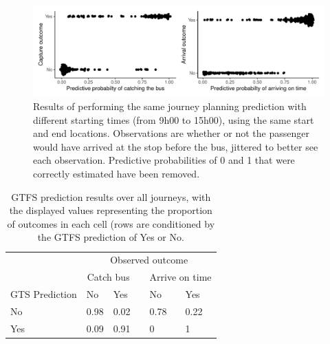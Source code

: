 \begin{knitrout}\small
{}\color{fgcolor}\begin{figure}

{\centering \includegraphics[width=\textwidth]{figure/eta_journey_results_avg-1} 

}

\caption[Results of performing the same journey planning prediction with different starting times (from  9h00 to 15h00), using the same start and end locations]{Results of performing the same journey planning prediction with different starting times (from  9h00 to 15h00), using the same start and end locations. Observations are whether or not the passenger would have arrived at the stop before the bus, jittered to better see each observation. Predictive probabilities of 0 and 1 that were correctly estimated have been removed.}\label{fig:eta_journey_results_avg}
\end{figure}

\begin{table}

\caption{\label{tab:eta_journey_results_avg}GTFS prediction results over all journeys, with the displayed values representing the proportion of outcomes in each cell (rows are conditioned by the GTFS prediction of Yes or No. }
\centering
\fontsize{8}{10}\selectfont
\begin{tabular}[t]{llllll}
\toprule
\multicolumn{1}{c}{} & \multicolumn{5}{c}{Observed outcome} \\
\cmidrule(l{3pt}r{3pt}){2-6}
\multicolumn{1}{c}{ } & \multicolumn{2}{c}{Catch bus} & \multicolumn{1}{c}{} & \multicolumn{2}{c}{Arrive on time} \\
\cmidrule(l{3pt}r{3pt}){2-3} \cmidrule(l{3pt}r{3pt}){5-6}
GTS Prediction & No & Yes &  & No & Yes\\
\midrule
No & 0.98 & 0.02 &  & 0.78 & 0.22\\
Yes & 0.09 & 0.91 &  & 0 & 1\\
\bottomrule
\end{tabular}
\end{table}


\end{knitrout}

